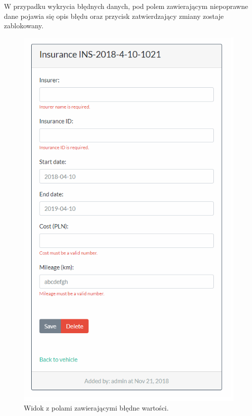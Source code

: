 \documentclass[eng,printmode,openany]{mgr}
\begin{document}
	
	
	W przypadku wykrycia błędnych danych, pod polem zawierającym niepoprawne dane pojawia się opis błędu oraz przycisk zatwierdzający zmiany zostaje zablokowany.
	\begin{figure}[H]
		\centering
		\includegraphics[scale=0.7]{images/insurance_validation_errors.png}
		\caption{Widok z polami zawierającymi błędne wartości.}
	\end{figure}
\end{document}
